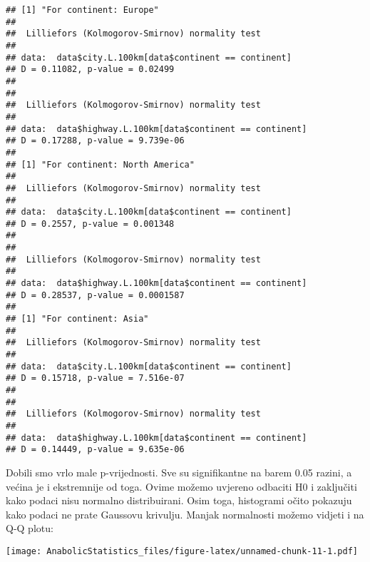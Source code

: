 \documentclass[
]{article}
\newenvironment{Shaded}{\begin{snugshade}}{\end{snugshade}}
\newcommand{\AttributeTok}[1]{\textcolor[rgb]{0.13,0.29,0.53}{#1}}
\newcommand{\FloatTok}[1]{\textcolor[rgb]{0.00,0.00,0.81}{#1}}
\newcommand{\FunctionTok}[1]{\textcolor[rgb]{0.13,0.29,0.53}{\textbf{#1}}}
\newcommand{\NormalTok}[1]{#1}
\newcommand{\SpecialCharTok}[1]{\textcolor[rgb]{0.81,0.36,0.00}{\textbf{#1}}}
\newcommand{\StringTok}[1]{\textcolor[rgb]{0.31,0.60,0.02}{#1}}
\begin{document}
\begin{verbatim}
## [1] "For continent: Europe"
## 
##  Lilliefors (Kolmogorov-Smirnov) normality test
## 
## data:  data$city.L.100km[data$continent == continent]
## D = 0.11082, p-value = 0.02499
## 
## 
##  Lilliefors (Kolmogorov-Smirnov) normality test
## 
## data:  data$highway.L.100km[data$continent == continent]
## D = 0.17288, p-value = 9.739e-06
## 
## [1] "For continent: North America"
## 
##  Lilliefors (Kolmogorov-Smirnov) normality test
## 
## data:  data$city.L.100km[data$continent == continent]
## D = 0.2557, p-value = 0.001348
## 
## 
##  Lilliefors (Kolmogorov-Smirnov) normality test
## 
## data:  data$highway.L.100km[data$continent == continent]
## D = 0.28537, p-value = 0.0001587
## 
## [1] "For continent: Asia"
## 
##  Lilliefors (Kolmogorov-Smirnov) normality test
## 
## data:  data$city.L.100km[data$continent == continent]
## D = 0.15718, p-value = 7.516e-07
## 
## 
##  Lilliefors (Kolmogorov-Smirnov) normality test
## 
## data:  data$highway.L.100km[data$continent == continent]
## D = 0.14449, p-value = 9.635e-06
\end{verbatim}

Dobili smo vrlo male p-vrijednosti. Sve su signifikantne na barem 0.05
razini, a većina je i ekstremnije od toga. Ovime možemo uvjereno
odbaciti H0 i zaključiti kako podaci nisu normalno distribuirani. Osim
toga, histogrami očito pokazuju kako podaci ne prate Gaussovu krivulju.
Manjak normalnosti možemo vidjeti i na Q-Q plotu:

\begin{Shaded}
\end{Shaded}

\texttt{[image: AnabolicStatistics\_files/figure-latex/unnamed-chunk-11-1.pdf]}

\begin{Shaded}
\end{Shaded}
\end{document}
